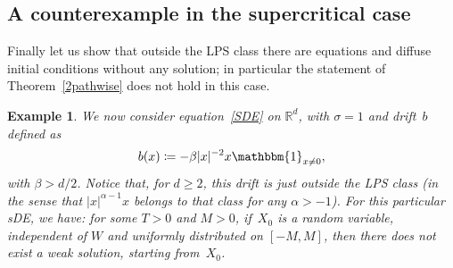 \documentclass[a4paper,10pt]{article}
\newtheorem{example}[theorem]{Example}
\newcommand\1{\mathbbm{1}}
\numberwithin{equation}{section}
\begin{document}
\subsection{A counterexample in the supercritical case}

Finally let us show that outside the LPS class there are equations and diffuse initial conditions without any solution; in particular the statement of Theorem~\ref{2pathwise} does not hold in this case.

\begin{example}\label{counterex}
 We now consider equation~\eqref{SDE} on $\mathbb{R}^d$, with $\sigma = 1$ and drift~$b$ defined as
\begin{equation*}
b(x) \coloneqq -\beta |x|^{-2} x  \1_{x\neq0} ,
\end{equation*}
with $\beta>d/2$. Notice that, for $d\ge 2$, this drift is just outside the LPS class \textup{(}in the sense that $|x|^{\alpha-1}x$ belongs to that class for any $\alpha>-1$\textup{)}. For this particular sDE, we have: for some $T>0$ and $M>0$, if~$X_0$ is a random variable, independent of $W$ and uniformly distributed on $[-M,M]$, then there does not exist a weak solution, starting from~$X_0$.
\end{example}
\end{document}
